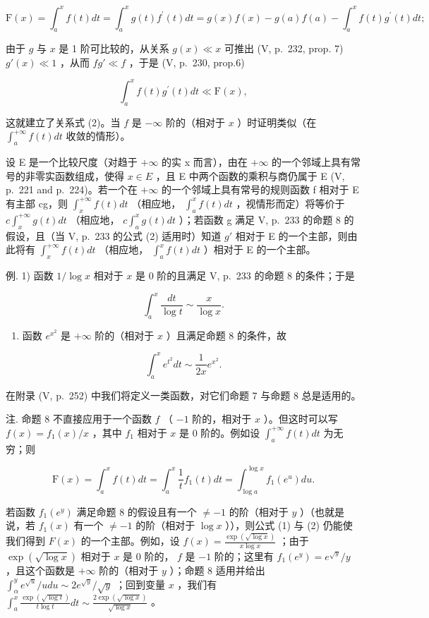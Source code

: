 \[
\mathrm{F} (x) = \int_ {a} ^ {x} f (t) d t = \int_ {a} ^ {x} g (t) f ^ {\prime} (t) d t = g (x) f (x) - g (a) f (a) - \int_ {a} ^ {x} f (t) g ^ {\prime} (t) d t;
\]

由于 \(g\) 与 \(x\) 是 1 阶可比较的，从关系 \(g(x) \ll x\) 可推出 (V, p.~232, prop. 7) \(g'(x) \ll 1\) ，从而 \(fg' \ll f\) ，于是 (V, p.~230, prop.6)

\[
\int_ {a} ^ {x} f (t) g ^ {\prime} (t) d t \ll \mathrm{F} (x),
\]

这就建立了关系式 (2)。当 \(f\) 是 \(-\infty\) 阶的（相对于 \(x\) ）时证明类似（在 \(\int_{a}^{+\infty} f(t) dt\) 收敛的情形）。

设 E 是一个比较尺度（对趋于 \(+\infty\) 的实 x 而言），由在 \(+\infty\) 的一个邻域上具有常号的非零实函数组成，使得 \(x \in E\) ，且 E 中两个函数的乘积与商仍属于 E (V, p.~221 and p.~224)。若一个在 \(+\infty\) 的一个邻域上具有常号的规则函数 f 相对于 E 有主部 cg，则 \(\int_{x}^{+\infty} f(t) dt\) （相应地， \(\int_{a}^{x} f(t) dt\) ，视情形而定）将等价于 \(c \int_{x}^{+\infty} g(t) dt\) （相应地， \(c \int_{a}^{x} g(t) dt\) ）；若函数 g 满足 V, p.~233 的命题 8 的假设，且（当 V, p.~233 的公式 (2) 适用时）知道 \(g'\) 相对于 E 的一个主部，则由此将有 \(\int_{x}^{+\infty} f(t) dt\) （相应地， \(\int_{a}^{x} f(t) dt\) ）相对于 E 的一个主部。

例. 1) 函数 \(1 / \log x\) 相对于 \(x\) 是 0 阶的且满足 V, p.~233 的命题 8 的条件；于是

\[
\int_ {a} ^ {x} \frac {d t}{\log t} \sim \frac {x}{\log x}.
\]

\begin{enumerate}
\def\labelenumi{\arabic{enumi})}
\setcounter{enumi}{1}
\tightlist
\item
  函数 \(e^{x^2}\) 是 \(+\infty\) 阶的（相对于 \(x\) ）且满足命题 8 的条件，故
\end{enumerate}

\[
\int_ {a} ^ {x} e ^ {t ^ {2}} d t \sim \frac {1}{2 x} e ^ {x ^ {2}}.
\]

在附录 (V, p.~252) 中我们将定义一类函数，对它们命题 7 与命题 8 总是适用的。

注. 命题 8 不直接应用于一个函数 \(f\) （ \(-1\) 阶的，相对于 \(x\) ）。但这时可以写 \(f(x) = f_1(x) / x\) ，其中 \(f_1\) 相对于 \(x\) 是 0 阶的。例如设 \(\int_{a}^{+\infty} f(t) dt\) 为无穷；则

\[
\mathrm{F} (x) = \int_ {a} ^ {x} f (t) d t = \int_ {a} ^ {x} \frac {1}{t} f _ {1} (t) d t = \int_ {\log a} ^ {\log x} f _ {1} \left(e ^ {u}\right) d u.
\]

若函数 \(f_{1}(e^{y})\) 满足命题 8 的假设且有一个 \(\neq -1\) 的阶（相对于 \(y\) ）（也就是说，若 \(f_{1}(x)\) 有一个 \(\neq -1\) 的阶（相对于 \(\log x\) ）），则公式 (1) 与 (2) 仍能使我们得到 \(F(x)\) 的一个主部。例如，设 \(f(x) = \frac{\exp(\sqrt{\log x})}{x\log x}\) ；由于 \(\exp(\sqrt{\log x})\) 相对于 \(x\) 是 0 阶的， \(f\) 是 \(-1\) 阶的；这里有 \(f_{1}(e^{y}) = e^{\sqrt{y}} / y\) ，且这个函数是 \(+\infty\) 阶的（相对于 \(y\) ）；命题 8 适用并给出 \(\int_{\alpha}^{y} e^{\sqrt{u}} / u du \sim 2e^{\sqrt{y}} / \sqrt{y}\) ；回到变量 \(x\) ，我们有 \(\int_{a}^{x} \frac{\exp(\sqrt{\log t})}{t\log t} dt \sim \frac{2\exp(\sqrt{\log x})}{\sqrt{\log x}}\) 。


